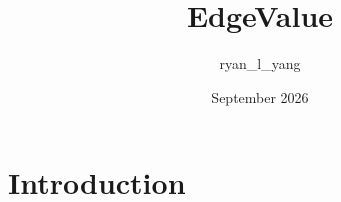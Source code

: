 \documentclass{article}
\title{EdgeValue}
\author{ryan\_l\_yang }
\date{September 2026}
\begin{document}
\maketitle

\section{Introduction}






\clearpage
\appendix


\clearpage


\clearpage


\end{document}
